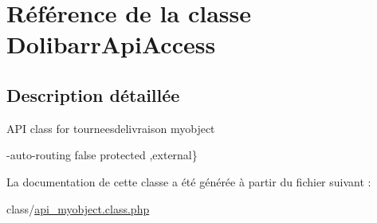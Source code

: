 \hypertarget{classDolibarrApiAccess}{}\section{Référence de la classe Dolibarr\+Api\+Access}
\label{classDolibarrApiAccess}


\subsection{Description détaillée}
A\+PI class for tourneesdelivraison myobject

-\/auto-\/routing false  protected ,external\} 

La documentation de cette classe a été générée à partir du fichier suivant \+:\begin{DoxyCompactItemize}
\item 
class/\hyperlink{api__myobject_8class_8php}{api\+\_\+myobject.\+class.\+php}\end{DoxyCompactItemize}
